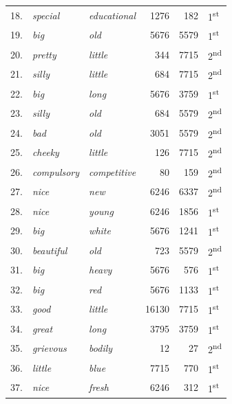 \begin{table}
{\begin{tabular}[t]{rllrrl}
18. & \textit{special} & \textit{educational} & \num{1276} & \num{182} & 1\textsuperscript{st} \\
19. & \textit{big} & \textit{old} & \num{5676} & \num{5579} & 1\textsuperscript{st} \\
20. & \textit{pretty} & \textit{little} & \num{344} & \num{7715} & 2\textsuperscript{nd} \\
21. & \textit{silly} & \textit{little} & \num{684} & \num{7715} & 2\textsuperscript{nd} \\
22. & \textit{big} & \textit{long} & \num{5676} & \num{3759} & 1\textsuperscript{st} \\
23. & \textit{silly} & \textit{old} & \num{684} & \num{5579} & 2\textsuperscript{nd} \\
24. & \textit{bad} & \textit{old} & \num{3051} & \num{5579} & 2\textsuperscript{nd} \\
25. & \textit{cheeky} & \textit{little} & \num{126} & \num{7715} & 2\textsuperscript{nd} \\
26. & \textit{compulsory} & \textit{competitive} & \num{80} & \num{159} & 2\textsuperscript{nd} \\
27. & \textit{nice} & \textit{new} & \num{6246} & \num{6337} & 2\textsuperscript{nd} \\
28. & \textit{nice} & \textit{young} & \num{6246} & \num{1856} & 1\textsuperscript{st} \\
29. & \textit{big} & \textit{white} & \num{5676} & \num{1241} & 1\textsuperscript{st} \\
30. & \textit{beautiful} & \textit{old} & \num{723} & \num{5579} & 2\textsuperscript{nd} \\
31. & \textit{big} & \textit{heavy} & \num{5676} & \num{576} & 1\textsuperscript{st} \\
32. & \textit{big} & \textit{red} & \num{5676} & \num{1133} & 1\textsuperscript{st} \\
33. & \textit{good} & \textit{little} & \num{16130} & \num{7715} & 1\textsuperscript{st} \\
34. & \textit{great} & \textit{long} & \num{3795} & \num{3759} & 1\textsuperscript{st} \\
35. & \textit{grievous} & \textit{bodily} & \num{12} & \num{27} & 2\textsuperscript{nd} \\
36. & \textit{little} & \textit{blue} & \num{7715} & \num{770} & 1\textsuperscript{st} \\
37. & \textit{nice} & \textit{fresh} & \num{6246} & \num{312} & 1\textsuperscript{st} \\

\end{tabular}}
\end{table}
